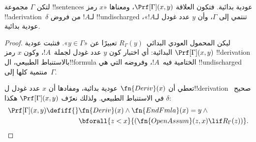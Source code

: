 \documentclass[../../../include/open-logic-section]{subfiles}
\begin{document}
\begin{prop}
  لتكن $\Gamma$ مجموعة !!{sentence}s عودية بدائية. فتكون
  العلاقة $\Prf[\Gamma](x,y)$، ومعناها «$x$ رمز
  !!a{derivation}~$\delta$ لـ$!A$ من فروض !!{undischarged} تنتمي إلى
  $\Gamma$، وأن $y$ عدد غودل لـ$!A$»، عودية بدائية.
\end{prop}

\begin{proof}
  ليكن المحمول العودي البدائي~$R_\Gamma(y)$
  تعبيرًا عن «$y\in\Gamma$».
  فنثبت عودية $\Prf[\Gamma](x,y)$
  البدائية: أي اختبار كون $y$ عدد غودل
  لجملة~$!A$، وكون $x$ رمز
  !!{derivation} بالاستنباط الطبيعي،
  ال!!{formula} الختامية فيه~$!A$،
  وفروضه التي هي !!{undischarged}
  منتمية كلها إلى~$\Gamma$.

  تعطي  أن $\fn{Deriv}(x)$
  عودية بدائية، ومفادها أن $x$ عدد غودل
  ل!!{derivation} صحيح~$\delta$ في الاستنباط الطبيعي.
  ولذلك نعرّف $\Prf[\Gamma](x,y)$ هكذا:
  \begin{align*}
    \Prf[\Gamma](x, y) \defiff {}
    & \fn{Deriv}(x) \land \fn{EndFmla}(x) = y \land {} \\
    & \bforall{z < x}{(\fn{OpenAssum}(z, x) \lif R_\Gamma(z))}.
  \end{align*}
\end{proof}
\end{document}
